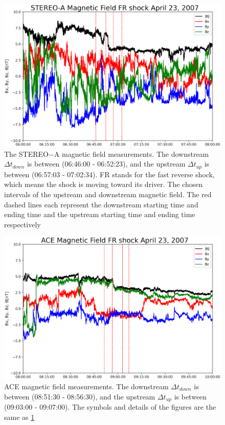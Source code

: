 \documentclass[draft]{agujournal2019}
\begin{document}
 \pagebreak

\begin{figure}[!t]
\centering
\includegraphics[width=1.\textwidth]{jgr-2023-ipshocks-f22.eps}
\caption{The STEREO$-$A magnetic field measurements. The downstream $\Delta t_{down}$ is between (06:46:00 - 06:52:23), and the upstream $\Delta t_{up}$ is between (06:57:03 - 07:02:34). FR stands for the fast reverse shock, which means the shock is moving toward its driver. The chosen intervals of the upstream and downstream magnetic field. The red dashed lines each represent the downstream starting time and ending time and the upstream starting time and ending time respectively}
\label{fig:staB0423}
\end{figure}

\pagebreak

\begin{figure}[!t]
\centering
\includegraphics[width=1.\textwidth]{jgr-2023-ipshocks-f23.eps}
\caption{ACE magnetic field measurements. The downstream $\Delta t_{down}$ is between (08:51:30 - 08:56:30), and the upstream $\Delta t_{up}$ is between (09:03:00 - 09:07:00). The symbols and details of the figures are the same as \ref{fig:staB0423}}
\label{fig:aceB0423}
\end{figure}
\end{document}
